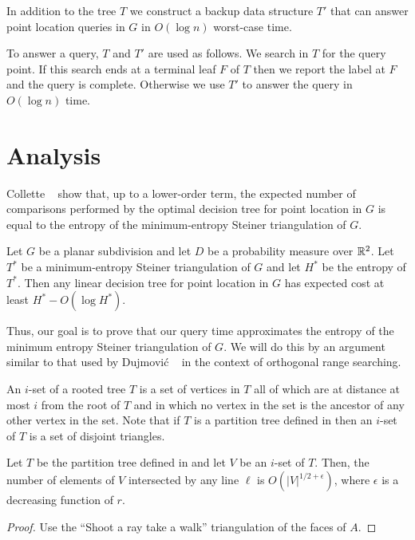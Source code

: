 \documentclass{patmorin}
\begin{document}
In addition to the tree $T$ we construct a backup data structure $T'$ that
can answer point location queries in $G$ in $O(\log n)$ worst-case time.

To answer a query, $T$ and $T'$ are used as follows.  We search in $T$
for the query point. If this search ends at a terminal leaf $F$ of $T$
then we report the label at $F$ and the query is complete.  Otherwise we
use $T'$ to answer the query in $O(\log n)$ time.

\section{Analysis}

Collette \etal\ \cite{cdilm08,cdilm09} show that, up to a lower-order
term, the expected number of comparisons performed by the optimal
decision tree for point location in $G$ is equal to the entropy of the
minimum-entropy Steiner triangulation of $G$.

\begin{thm}
Let $G$ be a planar subdivision and let $D$ be a probability measure
over $\mathbb{R}^2$.  Let $T^*$ be a  minimum-entropy Steiner triangulation of
$G$ and let $H^*$ be the entropy of $T^*$.  Then any linear decision tree
for point location in $G$ has expected cost at least $H^*-O(\log H^*)$.
\end{thm}

Thus, our goal is to prove that our query time approximates the entropy
of the minimum entropy Steiner triangulation of $G$.  We will do this
by an argument similar to that used by Dujmovi\'c \etal\ \cite{dhm09}
in the context of orthogonal range searching.

An $i$-set of a rooted tree $T$ is a set of vertices in $T$ all of
which are at distance at most $i$ from the root of $T$ and in which
no vertex in the set is the ancestor of any other vertex in the set.
Note that if $T$ is a partition tree defined in 
then an $i$-set of $T$ is a set of disjoint triangles.

\begin{lem}
Let $T$ be the partition tree defined in 
and let $V$ be an $i$-set of $T$.  Then, the number of elements of
$V$ intersected by any line $\ell$ is $O(|V|^{1/2+\epsilon})$, where
$\epsilon$ is a decreasing function of $r$.
\end{lem}

\begin{proof}
Use the ``Shoot a ray take a walk'' triangulation of the faces of $A$.
\end{proof}
\end{document}
